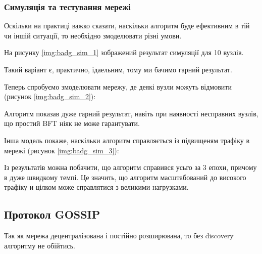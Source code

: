\documentclass{lib/styles/default-style}
\begin{document}
    \subsubsection{Симуляція та тестування мережі}

    Оскільки на практиці важко сказати, наскільки алгоритм буде ефективним в тій чи іншій ситуації, то 
    необхідно змоделювати різні умови.

    На рисунку \ref{img:badg_sim_1} зображений результат симуляції для 10 вузлів.

    
    Такий варіант є, практично, ідаельним, тому ми бачимо гарний результат.

    Теперь спробуємо змоделювати мережу, де деякі вузли можуть відмовити (рисунок \ref{img:badg_sim_2}):


    Алгоритм показав дуже гарний результат, навіть при наявності несправних вузлів, що простий BFT ніяк не може гарантувати.

    Інша модель покаже, наскільки алгоритм справляється із підвищеням трафіку в мережі (рисунок \ref{img:badg_sim_3}):


    Із результатів можна побачити, що алгоритм справився усьго за 3 епохи, причому в дуже швидкому темпі.
    Це значить, що алгоритм масштабований до високого трафіку и цілком може справлятися з великими нагрузками.

\subsection{Протокол GOSSIP}  

    Так як мережа децентралізована і постійно розширювана, то без discovery алгоритму не обійтись.
\end{document}
